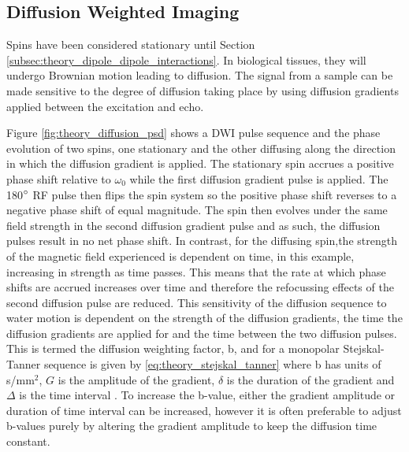 
\subsection{Diffusion Weighted Imaging}
\label{subsec:theory_diffusion}
Spins have been considered stationary until Section \ref{subsec:theory_dipole_dipole_interactions}. In biological tissues, they will undergo Brownian motion leading to diffusion. The signal from a sample can be made sensitive to the degree of diffusion taking place by using diffusion gradients applied between the excitation and echo. 

Figure \ref{fig:theory_diffusion_psd} shows a \ac{DWI} pulse sequence and the phase evolution of two spins, one stationary and the other diffusing along the direction in which the diffusion gradient is applied. The stationary spin accrues a positive phase shift relative to $\omega_0$ while the first diffusion gradient pulse is applied. The 180$\degree$ \ac{RF} pulse then flips the spin system so the positive phase shift reverses to a negative phase shift of equal magnitude. The spin then evolves under the same field strength in the second diffusion gradient pulse and as such, the diffusion pulses result in no net phase shift. In contrast, for the diffusing spin,the strength of the magnetic field experienced is dependent on time, in this example, increasing in strength as time passes. This means that the rate at which phase shifts are accrued increases over time and therefore the refocussing effects of the second diffusion pulse are reduced. This sensitivity of the diffusion sequence to water motion is dependent on the strength of the diffusion gradients, the time the diffusion gradients are applied for and the time between the two diffusion pulses. This is termed the diffusion weighting factor, b, and for a monopolar Stejskal-Tanner sequence is given by \eqref{eq:theory_stejskal_tanner} where b has units of s/mm$^2$, $G$ is the amplitude of the gradient, $\delta$ is the duration of the gradient and $\Delta$ is the time interval \cite{stejskal_spin_1965}. To increase the b-value, either the gradient amplitude or duration of time interval can be increased, however it is often preferable to adjust b-values purely by altering the gradient amplitude to keep the diffusion time constant.

